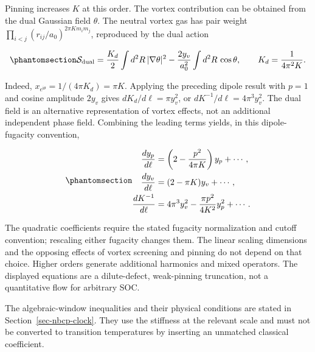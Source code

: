 Pinning increases \(K\) at this order. The vortex contribution can be
obtained from the dual Gaussian field \(\theta\). The neutral vortex gas
has pair weight \(\prod_{i<j}(r_{ij}/a_0)^{2\pi K m_i m_j}\), reproduced
by the dual action

\begin{equation}\phantomsection\label{eq-nbcp-clock-dual-action}{
\mathcal S_{\rm dual}
=\frac{K_d}{2}\int d^2R\,|\nabla\theta|^2
-\frac{2y_v}{a_0^2}\int d^2R\,\cos\theta,
\qquad K_d=\frac{1}{4\pi^2K}.
}\end{equation}

Indeed, \(x_{e^{\mathrm i\theta}}=1/(4\pi K_d)=\pi K\). Applying the
preceding dipole result with \(p=1\) and cosine amplitude \(2y_v\) gives
\(dK_d/d\ell=\pi y_v^2\), or \(dK^{-1}/d\ell=4\pi^3y_v^2\). The dual
field is an alternative representation of vortex effects, not an
additional independent phase field. Combining the leading terms yields,
in this dipole-fugacity convention,

\begin{equation}\phantomsection\label{eq-nbcp-clock-coupled-flow}{
\begin{aligned}
\frac{dy_p}{d\ell}&=\left(2-\frac{p^2}{4\pi K}\right)y_p+\cdots,\\
\frac{dy_v}{d\ell}&=(2-\pi K)y_v+\cdots,\\
\frac{dK^{-1}}{d\ell}&=4\pi^3y_v^2-
\frac{\pi p^2}{4K^2}y_p^2+\cdots.
\end{aligned}
}\end{equation}

The quadratic coefficients require the stated fugacity normalization and
cutoff convention; rescaling either fugacity changes them. The linear
scaling dimensions and the opposing effects of vortex screening and
pinning do not depend on that choice. Higher orders generate additional
harmonics and mixed operators. The displayed equations are a
dilute-defect, weak-pinning truncation, not a quantitative flow for
arbitrary SOC.

The algebraic-window inequalities and their physical conditions are
stated in Section~\ref{sec-nbcp-clock}. They use the stiffness at the
relevant scale and must not be converted to transition temperatures by
inserting an unmatched classical coefficient.
